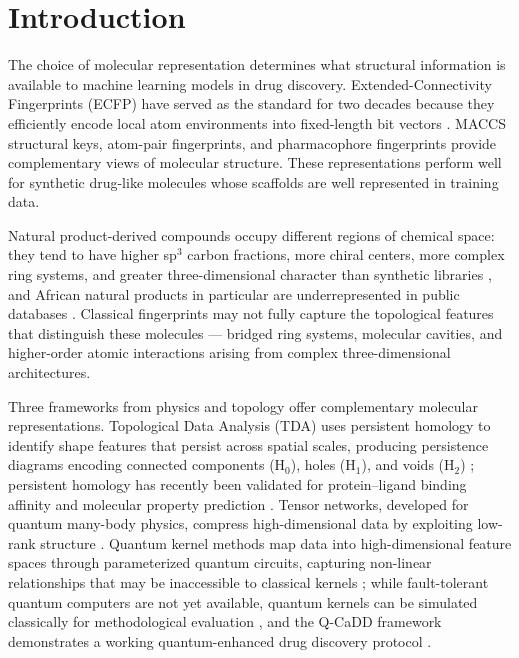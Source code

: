 \documentclass[11pt,a4paper]{article}
\begin{document}

\section{Introduction}

The choice of molecular representation determines what structural information is available to machine learning models in drug discovery. Extended-Connectivity Fingerprints (ECFP) have served as the standard for two decades because they efficiently encode local atom environments into fixed-length bit vectors \citep{ecfp_2010}. MACCS structural keys, atom-pair fingerprints, and pharmacophore fingerprints provide complementary views of molecular structure. These representations perform well for synthetic drug-like molecules whose scaffolds are well represented in training data.

Natural product-derived compounds occupy different regions of chemical space: they tend to have higher sp$^3$ carbon fractions, more chiral centers, more complex ring systems, and greater three-dimensional character than synthetic libraries \citep{coconut_2021}, and African natural products in particular are underrepresented in public databases \citep{anpdb_2026,value_addition_african_np_2025}. Classical fingerprints may not fully capture the topological features that distinguish these molecules --- bridged ring systems, molecular cavities, and higher-order atomic interactions arising from complex three-dimensional architectures.

Three frameworks from physics and topology offer complementary molecular representations. Topological Data Analysis (TDA) uses persistent homology to identify shape features that persist across spatial scales, producing persistence diagrams encoding connected components (H$_0$), holes (H$_1$), and voids (H$_2$) \citep{tda_review_2025}; persistent homology has recently been validated for protein--ligand binding affinity \citep{tda_binding_affinity_2026} and molecular property prediction \citep{tda_pretraining_2026}. Tensor networks, developed for quantum many-body physics, compress high-dimensional data by exploiting low-rank structure \citep{tensornet_2023,tn_efficient_2026}. Quantum kernel methods map data into high-dimensional feature spaces through parameterized quantum circuits, capturing non-linear relationships that may be inaccessible to classical kernels \citep{qml_review_2026}; while fault-tolerant quantum computers are not yet available, quantum kernels can be simulated classically for methodological evaluation \citep{pqc_chemistry_2026}, and the Q-CaDD framework demonstrates a working quantum-enhanced drug discovery protocol \citep{q_cadd_2026}.
\end{document}
